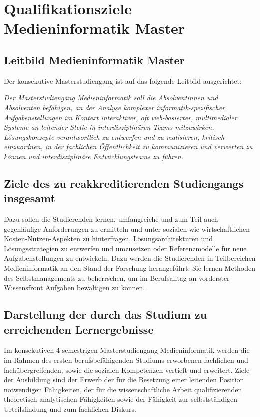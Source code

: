 \chapter{Qualifikationsziele Medieninformatik
Master}\label{qualifikationsziele-medieninformatik-master}

\section{Leitbild Medieninformatik
Master}\label{leitbild-medieninformatik-master}

Der konsekutive Masterstudiengang ist auf das folgende Leitbild
ausgerichtet:

\emph{Der Masterstudiengang Medieninformatik soll die Absolventinnen und
Absolventen befähigen, an der Analyse komplexer informatik-spezifischer
Aufgabenstellungen im Kontext interaktiver, oft web-basierter,
multimedialer Systeme an leitender Stelle in interdisziplinären Teams
mitzuwirken, Lösungskonzepte verantwortlich zu entwerfen und zu
realisieren, kritisch einzuordnen, in der fachlichen Öffentlichkeit zu
kommunizieren und verwerten zu können und interdisziplinäre
Entwicklungsteams zu führen.}

\section{Ziele des zu reakkreditierenden Studiengangs
insgesamt}\label{ziele-des-zu-reakkreditierenden-studiengangs-insgesamt}

Dazu sollen die Studierenden lernen, umfangreiche und zum Teil auch
gegenläufige Anforderungen zu ermitteln und unter sozialen wie
wirtschaftlichen Kosten-Nutzen-Aspekten zu hinterfragen,
Lösungsarchitekturen und Lösungsstrategien zu entwerfen und umzusetzen
oder Referenzmodelle für neue Aufgabenstellungen zu entwickeln. Dazu
werden die Studierenden in Teilbereichen Medieninformatik an den Stand
der Forschung herangeführt. Sie lernen Methoden des Selbstmanagements zu
beherrschen, um im Berufsalltag an vorderster Wissensfront Aufgaben
bewältigen zu können.

\section{Darstellung der durch das Studium zu erreichenden
Lernergebnisse}\label{darstellung-der-durch-das-studium-zu-erreichenden-lernergebnisse}

Im konsekutiven 4-semestrigen Masterstudiengang Medieninformatik werden
die im Rahmen des ersten berufsbefähigenden Studiums erworbenen
fachlichen und fachübergreifenden, sowie die sozialen Kompetenzen
vertieft und erweitert. Ziele der Ausbildung sind der Erwerb der für die
Besetzung einer leitenden Position notwendigen Fähigkeiten, der für die
wissenschaftliche Arbeit qualifizierenden theoretisch-analytischen
Fähigkeiten sowie der Fähigkeit zur selbstständigen Urteilsfindung und
zum fachlichen Diskurs.

